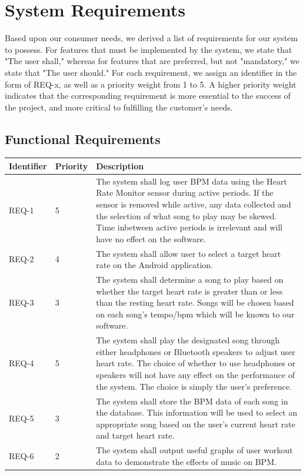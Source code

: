 \documentclass[letterpaper,english, 12pt]{scrreprt}
\begin{document}
\chapter{System Requirements}
Based upon our consumer needs, we derived a list of requirements for our system to
possess. For features that must be implemented by the system, we state that "The
user shall," whereas for features that are preferred, but not "mandatory," we state
that "The user should." For each requirement, we assign an identifier in the form of
REQ-x, as well as a priority weight from 1 to 5. A higher priority weight indicates
that the corresponding requirement is more essential to the success of the project,
and more critical to fulfilling the customer's needs.

\section{Functional Requirements}
\begin{center}
	\begin{tabular}{|C{2cm}|C{2cm}|C{8cm}|}
		\hline
			Identifier & Priority & Description\\
		\hline
			REQ-1 & 5 & The system shall log user BPM data using the Heart Rate Monitor sensor during active periods. If the sensor is removed while active, any data collected and the selection of what song to play may be skewed. Time inbetween active periods is irrelevant and will have no effect on the software.\\
		\hline
			REQ-2 & 4 & The system shall allow user to select a target heart rate on the Android application.\\
		\hline
			REQ-3 & 3 & The system shall determine a song to play based on whether the target heart rate is greater than or less than the resting heart rate. Songs will be chosen based on each song's tempo/bpm which will be known to our software.\\
		\hline
			REQ-4 & 5 & The system shall play the designated song through either headphones or Bluetooth speakers to adjust user heart rate. The choice of whether to use headphones or speakers will not have any effect on the performance of the system. The choice is simply the user's preference.\\
		\hline
			REQ-5 & 3 & The system shall store the BPM data of each song in the database. This information will be used to select an appropriate song based on the user's current heart rate and target heart rate.\\
		\hline
			REQ-6 & 2 & The system shall output useful graphs of user workout data to demonstrate the effects of music on BPM.\\
        \hline
    \end{tabular}
\end{center}
\end{document}
